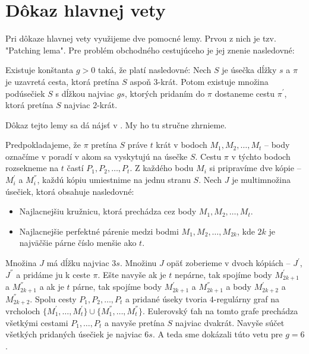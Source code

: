 \section{Dôkaz hlavnej vety}

Pri dôkaze hlavnej vety využijeme dve pomocné lemy. Prvou z nich je tzv. "Patching lema".
Pre problém obchodného cestujúceho je jej znenie nasledovné:

\begin{lema}
Existuje konštanta $g > 0$ taká, že platí nasledovné: Nech $S$ je úsečka dĺžky $s$ a $\pi$ je
uzavretá cesta, ktorá pretína $S$ aspoň $3$-krát. Potom existuje množina podúsečiek $S$ s dĺžkou najviac
$gs$, ktorých pridaním do $\pi$ dostaneme cestu $\pi^{'}$, ktorá pretína $S$ najviac $2$-krát.
\end{lema}

Dôkaz tejto lemy sa dá nájsť v \cite{Arora}. My ho tu stručne zhrnieme.

\begin{dokaz}
Predpokladajeme, že $\pi$ pretína $S$ práve $t$ krát v bodoch $M_1, M_2, \dots, M_t$ -- body
označíme v poradí v akom sa vyskytujú na úsečke $S$.
Cestu $\pi$ v týchto bodoch rozsekneme na $t$ častí $P_1, P_2, \dots, P_t$. Z každého bodu $M_i$
si pripravíme dve kópie -- $M_i^{'}$ a $M_i^{''}$, každú kópiu umiestnime na jednu stranu $S$.
Nech $J$ je multimnožina úsečiek, ktorá obsahuje nasledovné:
\begin{itemize}
\item Najlacnejšiu kružnicu, ktorá prechádza cez body $M_1, M_2, \dots, M_t$.
\item Najlacnejšie perfektné párenie medzi bodmi $M_1, M_2, \dots, M_{2k}$, kde $2k$ je najväčšie
párne číslo menšie ako $t$. 
\end{itemize}

Množina $J$ má dĺžku najviac $3s$. Množinu $J$ opäť zoberieme v dvoch kópiách -- $J^{'}$, $J^{''}$ a pridáme ju k ceste $\pi$.
Ešte navyše ak je $t$ nepárne, tak spojíme body $M_{2k+1}^{'}$ a $M_{2k+1}^{''}$ a ak je $t$ párne,
tak spojíme body $M_{2k+1}^{'}$ a $M_{2k+1}^{''}$ a body $M_{2k+2}^{'}$ a $M_{2k+2}^{''}$.
Spolu cesty $P_1, P_2, \dots, P_t$ a pridané úseky tvoria $4$-regulárny graf na vrcholoch
$\{M_1^{'}, \dots, M_t^{'}\} \cup \{M_1^{''}, \dots, M_t^{''}\}$. Eulerovský ťah na tomto grafe
prechádza všetkými cestami $P_1, \dots, P_t$ a navyše pretína $S$ najviac dvakrát. Navyše
súčet všetkých pridaných úsečiek je najviac $6s$. A teda sme dokázali túto vetu pre $g = 6$.
\end{dokaz}

